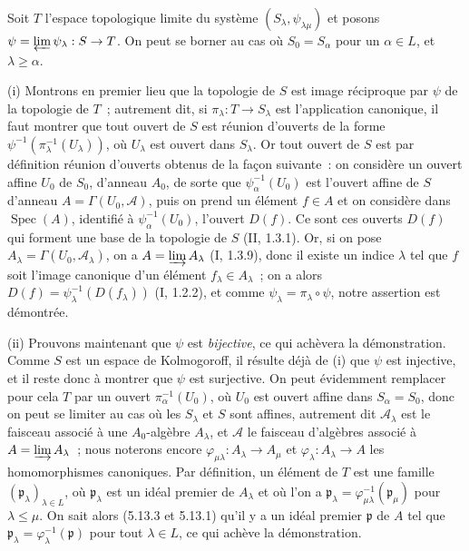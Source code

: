 Soit $T$ l'espace topologique limite du système
$(S_\lambda,\psi_{\lambda\mu})$ et posons
$\psi=\varprojlim\psi_\lambda:S\to T$. On peut se borner au cas où
$S_0=S_\alpha$ pour un $\alpha\in L$, et $\lambda\geq\alpha$.

\medskip
\noindent
(i) Montrons en premier lieu que la topologie de $S$ est image réciproque par
$\psi$ de la topologie de $T$~; autrement dit, si
$\pi_\lambda:T\to S_\lambda$ est l'application canonique, il faut montrer
que tout ouvert de $S$ est réunion d'ouverts de la forme
$\psi^{-1}(\pi_\lambda^{-1}(U_\lambda))$, où $U_\lambda$ est ouvert dans
$S_\lambda$. Or tout ouvert de $S$ est par définition réunion d'ouverts
obtenus de la façon suivante~: on considère un ouvert affine $U_0$ de $S_0$,
d'anneau $A_0$, de sorte que $\psi_\alpha^{-1}(U_0)$ est l'ouvert affine de
$S$ d'anneau $A=\Gamma(U_0,\mathscr A)$, puis on prend un élément $f\in A$ et
on considère dans $\operatorname{Spec}(A)$, identifié à
$\psi_\alpha^{-1}(U_0)$, l'ouvert $D(f)$. Ce sont ces ouverts $D(f)$ qui
forment une base de la topologie de $S$ (II, 1.3.1). Or, si on pose
$A_\lambda=\Gamma(U_0,\mathscr A_\lambda)$, on a
$A=\varinjlim A_\lambda$ (I, 1.3.9), donc il existe un indice $\lambda$ tel
que $f$ soit l'image canonique d'un élément $f_\lambda\in A_\lambda$~; on a
alors $D(f)=\psi_\lambda^{-1}(D(f_\lambda))$ (I, 1.2.2), et comme
$\psi_\lambda=\pi_\lambda\circ\psi$, notre assertion est démontrée.

\medskip
\noindent
(ii) Prouvons maintenant que $\psi$ est \emph{bijective}, ce qui achèvera la
démonstration. Comme $S$ est un espace de Kolmogoroff, il résulte déjà de (i)
que $\psi$ est injective, et il reste donc à montrer que $\psi$ est
surjective. On peut évidemment remplacer pour cela $T$ par un ouvert
$\pi_\alpha^{-1}(U_0)$, où $U_0$ est ouvert affine dans $S_\alpha=S_0$, donc
on peut se limiter au cas où les $S_\lambda$ et $S$ sont affines, autrement
dit $\mathscr A_\lambda$ est le faisceau associé à une $A_0$-algèbre
$A_\lambda$, et $\mathscr A$ le faisceau d'algèbres associé à
$A=\varinjlim A_\lambda$~; nous noterons encore
$\varphi_{\mu\lambda}:A_\lambda\to A_\mu$ et
$\varphi_\lambda:A_\lambda\to A$ les homomorphismes canoniques. Par
définition, un élément de $T$ est une famille
$(\mathfrak p_\lambda)_{\lambda\in L}$, où $\mathfrak p_\lambda$ est un
idéal premier de $A_\lambda$ et où l'on a
$\mathfrak p_\lambda=\varphi_{\mu\lambda}^{-1}(\mathfrak p_\mu)$ pour
$\lambda\leq\mu$. On sait alors (5.13.3 et 5.13.1) qu'il y a un idéal premier
$\mathfrak p$ de $A$ tel que
$\mathfrak p_\lambda=\varphi_\lambda^{-1}(\mathfrak p)$ pour tout
$\lambda\in L$, ce qui achève la démonstration.

